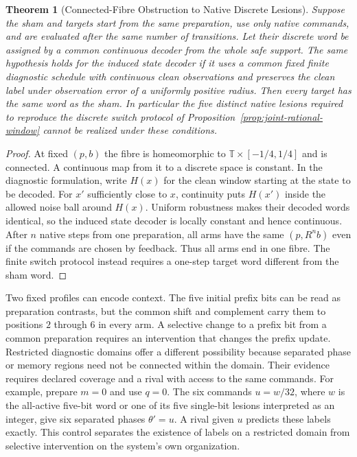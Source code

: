 \documentclass[11pt,a4paper]{article}
\newtheorem{theorem}{Theorem}[section]
\theoremstyle{definition}
\begin{document}
\begin{theorem}[Connected-Fibre Obstruction to Native Discrete Lesions]\label{thm:tower-native-lesion-obstruction}
Suppose the sham and targets start from the same preparation, use only native commands, and are evaluated after the same number of transitions. Let their discrete word be assigned by a common continuous decoder from the whole safe support. The same hypothesis holds for the induced state decoder if it uses a common fixed finite diagnostic schedule with continuous clean observations and preserves the clean label under observation error of a uniformly positive radius. Then every target has the same word as the sham. In particular the five distinct native lesions required to reproduce the discrete switch protocol of Proposition~\ref{prop:joint-rational-window} cannot be realized under these conditions.
\end{theorem}
\begin{proof}
At fixed $(p,b)$ the fibre is homeomorphic to $\mathbb T\times[-1/4,1/4]$ and is connected. A continuous map from it to a discrete space is constant. In the diagnostic formulation, write $H(x)$ for the clean window starting at the state to be decoded. For $x'$ sufficiently close to $x$, continuity puts $H(x')$ inside the allowed noise ball around $H(x)$. Uniform robustness makes their decoded words identical, so the induced state decoder is locally constant and hence continuous. After $n$ native steps from one preparation, all arms have the same $(p,R^n b)$ even if the commands are chosen by feedback. Thus all arms end in one fibre. The finite switch protocol instead requires a one-step target word different from the sham word.
\end{proof}

Two fixed profiles can encode context. The five initial prefix bits can be read as preparation contrasts, but the common shift and complement carry them to positions $2$ through $6$ in every arm. A selective change to a prefix bit from a common preparation requires an intervention that changes the prefix update. Restricted diagnostic domains offer a different possibility because separated phase or memory regions need not be connected within the domain. Their evidence requires declared coverage and a rival with access to the same commands. For example, prepare $m=0$ and use $q=0$. The six commands $u=w/32$, where $w$ is the all-active five-bit word or one of its five single-bit lesions interpreted as an integer, give six separated phases $\theta'=u$. A rival given $u$ predicts these labels exactly. This control separates the existence of labels on a restricted domain from selective intervention on the system's own organization.
\end{document}
